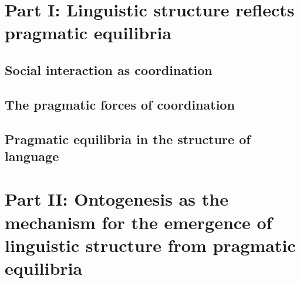\documentclass[man, noapacite, 12pt]{apa2}
\begin{document}
\section{Part I: Linguistic structure reflects pragmatic equilibria}
\subsection{Social interaction as coordination}

\subsection{The pragmatic forces of coordination}

\subsection{Pragmatic equilibria in the structure of language}

\section{Part II: Ontogenesis as the mechanism for the emergence of linguistic structure from pragmatic equilibria}




\end{document}
